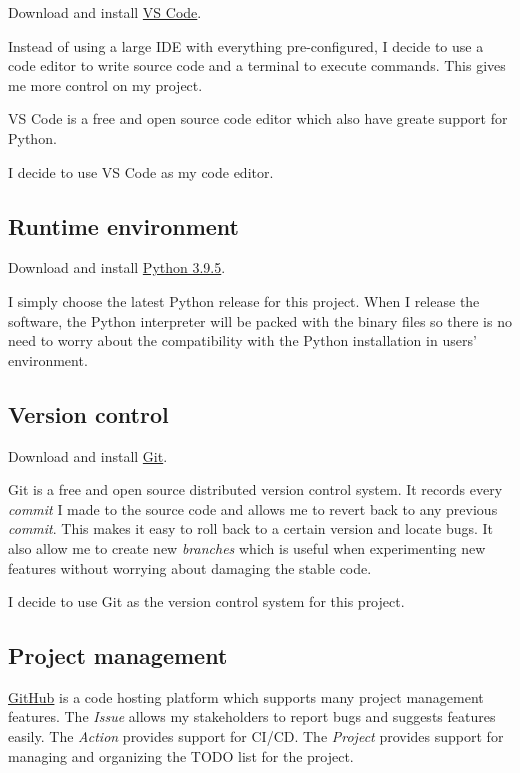 \documentclass[a4paper]{report}
\begin{document}
Download and install \href{https://code.visualstudio.com/}{VS Code}.

Instead of using a large IDE with everything pre-configured, I decide to use a code editor to write source code and a terminal to execute commands. This gives me more control on my project.

VS Code is a free and open source code editor which also have greate support for Python.

I decide to use VS Code as my code editor.

\subsection{Runtime environment}

Download and install \href{https://www.python.org/downloads/}{Python 3.9.5}.

I simply choose the latest Python release for this project. When I release the software, the Python interpreter will be packed with the binary files so there is no need to worry about the compatibility with the Python installation in users' environment.

\subsection{Version control}

Download and install \href{https://git-scm.com/}{Git}.

Git is a free and open source distributed version control system. It records every \emph{commit} I made to the source code and allows me to revert back to any previous \emph{commit}. This makes it easy to roll back to a certain version and locate bugs. It also allow me to create new \emph{branches} which is useful when experimenting new features without worrying about damaging the stable code.

I decide to use Git as the version control system for this project.

\subsection{Project management}

\href{https://github.com}{GitHub} is a code hosting platform which supports many project management features. The \emph{Issue} allows my stakeholders to report bugs and suggests features easily. The \emph{Action} provides support for CI/CD. The \emph{Project} provides support for managing and organizing the TODO list for the project.
\end{document}
